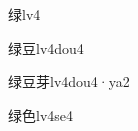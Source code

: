 \begin{verbete}[11]{绿}{lv4}
\end{verbete}
\begin{verbete}[11;7]{绿豆}{lv4dou4}
\end{verbete}
\begin{verbete}[11;7;7]{绿豆芽}{lv4dou4·ya2}
\end{verbete}
\begin{verbete}[11;6]{绿色}{lv4se4}
\end{verbete}

